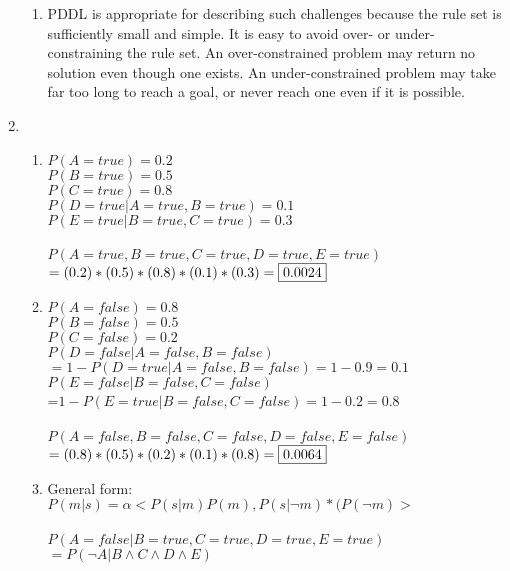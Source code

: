 \documentclass[12pt,a4paper]{report}
\begin{document}
\begin{enumerate}
\begin{enumerate}
	
	\item
	PDDL is appropriate for describing such challenges because the rule set is sufficiently small and simple. It is easy to avoid over- or under-constraining the rule set. An over-constrained problem may return no solution even though one exists. An under-constrained problem may take far too long to reach a goal, or never reach one even if it is possible.
	
\end{enumerate}

\pagebreak
\item
\begin{enumerate}
	\item
	$P(A=true)=0.2$\\
	$P(B=true)=0.5$\\
	$P(C=true)=0.8$\\
	$P(D=true | A=true, B=true)=0.1$\\
	$P(E=true|B=true, C=true)=0.3$\\ \\
	$P(A=true,B=true,C=true,D=true,E=true)$\\$=(0.2)*(0.5)*(0.8)*(0.1)*(0.3) = \fbox{0.0024}$
	\item
	$P(A=false)=0.8$\\
	$P(B=false)=0.5$\\
	$P(C=false)=0.2$\\
	$P(D=false|A=false,B=false)$\\$=1-P(D=true|A=false,B=false)=1-0.9=0.1$\\
	$P(E=false|B=false,C=false)$\\=$1-P(E=true|B=false,C=false)=1-0.2=0.8$\\ \\
	$P(A=false, B=false, C=false, D=false, E=false)$\\ $=(0.8)*(0.5)*(0.2)*(0.1)*(0.8) = \fbox{0.0064}$
	\item
	General form: $P(m|s)=\alpha <P(s|m)P(m),P(s|\neg m)*(P(\neg m)>$\\ \\
	$P(A=false|B=true,C=true,D=true,E=true)$\\$=P(\neg A| B \wedge C \wedge D \wedge E)$\\ \\

\end{enumerate}
\end{enumerate}
\end{document}
